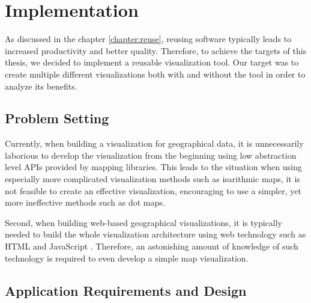 
\chapter{Implementation}
\label{chapter:implementation}




As discussed in the chapter \ref{chapter:reuse}, reusing software typically leads to increased productivity and better quality. Therefore, to achieve the targets of this thesis, we decided to implement a reusable visualization tool. Our target was to create multiple different visualizations both with and without the tool in order to analyze its benefits.


\section{Problem Setting}

Currently, when building a visualization for geographical data, it is unnecessarily laborious to develop the visualization from the beginning using low abstraction level APIs provided by mapping libraries. This leads to the situation when using especially more complicated visualization methods such as isarithmic maps, it is not feasible to create an effective visualization, encouraging to use a simpler, yet more ineffective methods such as dot maps.

Second, when building web-based geographical visualizations, it is typically needed to build the whole visualization architecture using web technology such as HTML \citep{world_wide_web_consortium_html5_2014} and JavaScript \citep{ecma_ecmascript_2011}. Therefore, an astonishing amount of knowledge of such technology is required to even develop a simple map visualization. 


\section{Application Requirements and Design}
\label{section:requirements}


